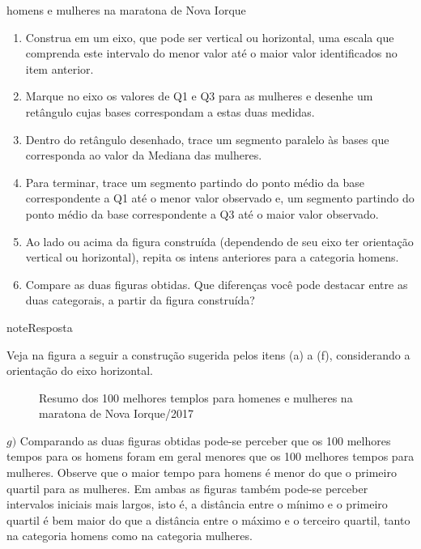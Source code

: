\begin{task}{homens e mulheres na maratona de Nova Iorque}
\begin{enumerate}
\item {} 
Construa em um eixo, que pode ser vertical ou horizontal, uma escala que comprenda este intervalo do menor valor até o maior valor identificados no item anterior.

\item {} 
Marque no eixo os valores de Q1 e Q3  para as mulheres e desenhe um retângulo cujas bases correspondam a estas duas medidas.

\item {} 
Dentro do retângulo desenhado, trace um segmento paralelo às bases que corresponda ao valor da Mediana das mulheres.

\item {} 
Para terminar, trace um segmento partindo do ponto médio da base correspondente a Q1 até o menor valor observado e, um segmento partindo do ponto médio da base correspondente a Q3 até o maior valor observado.

\item {} 
Ao lado ou acima da figura construída (dependendo de seu eixo ter orientação vertical ou horizontal), repita os intens anteriores para a categoria homens.

\item {} 
Compare as duas figuras obtidas. Que diferenças você pode destacar entre as duas categorais, a partir da figura construída?

\end{enumerate}
\end{task}

\begin{sphinxadmonition}{note}{Resposta}

Veja na figura a seguir a construção sugerida pelos itens (a) a (f), considerando a orientação do eixo horizontal.

\begin{figure}[H]
\centering
\capstart

\noindent{}
\caption{Resumo dos 100 melhores templos para homenes e mulheres na maratona de Nova Iorque/2017}\label{\detokenize{PE104-6:fig-boxplothm}}\label{\detokenize{PE104-6:id2}}\end{figure}

\(g)\) Comparando as duas figuras obtidas pode-se perceber que os 100 melhores tempos para os homens foram em geral menores que os 100 melhores tempos para mulheres. Observe que o maior tempo para homens é menor do que o primeiro quartil para as mulheres. Em ambas as figuras também pode-se perceber intervalos iniciais mais largos, isto é, a distância entre o mínimo e o primeiro quartil é bem maior do que a distância entre o máximo e o terceiro quartil, tanto na categoria homens como na categoria mulheres.
\end{sphinxadmonition}


